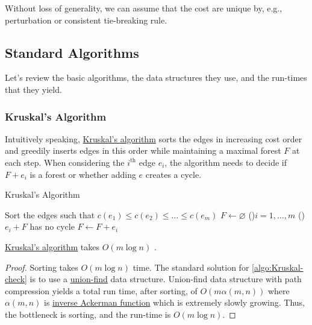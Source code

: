 \begin{remark}
	Without loss of generality, we can assume that the cost are unique by, e.g., perturbation or consistent tie-breaking rule.
\end{remark}

\subsection{Standard Algorithms}
Let's review the basic algorithms, the data structures they use, and the run-times that they yield.

\subsubsection{Kruskal's Algorithm}
Intuitively speaking, \hyperref[algo:Kruskal]{Kruskal's algorithm} sorts the edges in increasing cost order and greedily inserts edges in this order while maintaining a maximal forest \(F\) at each step. When considering the \(i^{\text{th} }\) edge \(e_i\), the algorithm needs to decide if \(F + e_i\) is a forest or whether adding \(e\) creates a cycle.

\begin{algorithm}[H]\label{algo:Kruskal}
	\DontPrintSemicolon{}
	\caption{Kruskal's Algorithm}
	\BlankLine

	Sort the edges such that \(c(e_1) \leq c(e_2) \leq \dots \leq c(e_m)\)
	\(F \gets \varnothing \)
	\For(){\(i = 1, \dots  , m\)}{
		\If(){\label{algo:Kruskal-check}\(e_i + F\) has no cycle}{
			\(F \gets F + e_i\)\;
		}
	}
	\;
\end{algorithm}

\begin{theorem}\label{thm:Kruskal}
	\hyperref[algo:Kruskal]{Kruskal's algorithm} takes \(O(m \log n)\) .
\end{theorem}
\begin{proof}
	Sorting takes \(O(m \log n)\) time. The standard solution for \autoref{algo:Kruskal-check} is to use a \href{https://en.wikipedia.org/wiki/Disjoint-set_data_structure}{union-find} data structure. Union-find data structure with path compression yields a total run time, after sorting, of \(O(m \alpha (m, n))\) where \(\alpha (m, n)\) is \href{https://en.wikipedia.org/wiki/Ackermann_function#Inverse}{inverse Ackerman function} which is extremely slowly growing. Thus, the bottleneck is sorting, and the run-time is \(O(m \log n)\).
\end{proof}

